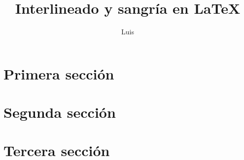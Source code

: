 \documentclass[11pt,a4paper]{article}
\author{Luis}
\title{Interlineado y sangr\'ia en \LaTeX}
\date{}
\begin{document}
\maketitle

\begin{abstract}
\blindtext[1]
\end{abstract}
\tableofcontents %

\section{Primera secci\'on}
\Blindtext [4][1]

\section{Segunda secci\'on}
\blindtext[1]
\blinditemize[4]
\blindmathtrue
\blindmathpaper
\blindmathfalse
\blindtext [2]

\section{Tercera secci\'on}
 \Blindtext [4][1]
\end{document}
